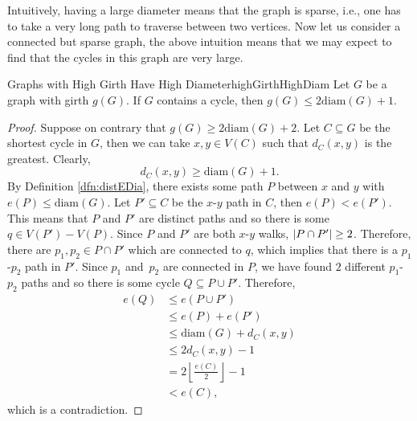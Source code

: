 \documentclass[math]{amznotes}
\theoremstyle{remark}
\newcommand{\0}{\mathbf{0}}
\newcommand{\1}{\mathbf{1}}
\begin{document}
Intuitively, having a large diameter means that the graph is sparse, i.e., one has to take a very long path to traverse between two vertices. Now let us consider a connected but sparse graph, the above intuition means that we may expect to find that the cycles in this graph are very large.
\begin{probox}{Graphs with High Girth Have High Diameter}{highGirthHighDiam}
    Let $G$ be a graph with girth $g(G)$. If $G$ contains a cycle, then $g(G) \leq 2\mathrm{diam}(G) + 1$.
    \tcblower
    \begin{proof}
        Suppose on contrary that $g(G) \geq 2\mathrm{diam}(G) + 2$. Let $C \subseteq G$ be the shortest cycle in $G$, then we can take $x, y \in V(C)$ such that $d_C(x, y)$ is the greatest. Clearly, 
        \begin{equation*}
            d_C(x, y) \geq \mathrm{diam}(G) + 1.
        \end{equation*}
        By Definition \ref{dfn:distEDia}, there exists some path $P$ between $x$ and $y$ with $e(P) \leq \mathrm{diam}(G)$. Let $P' \subseteq C$ be the $x$-$y$ path in $C$, then $e(P) < e(P')$. This means that $P$ and $P'$ are distinct paths and so there is some $q \in V(P') - V(P)$. Since $P$ and $P'$ are both $x$-$y$ walks, ${\left\lvert {P \cap P'} \right\rvert} \geq 2$. Therefore, there are $p_1, p_2 \in P \cap P'$ which are connected to $q$, which implies that there is a $p_1$-$p_2$ path in $P'$. Since $p_1$ and~$p_2$ are connected in $P$, we have found $2$ different $p_1$-$p_2$ paths and so there is some cycle $Q \subseteq P \cup P'$. Therefore,
        \begin{align*}
            e(Q) & \leq e(P\cup P') \\
            & \leq e(P) + e(P') \\
            & \leq \mathrm{diam}(G) + d_C(x, y) \\
            & \leq 2d_C(x, y) - 1 \\
            & = 2\left\lfloor\frac{e(C)}{2}\right\rfloor - 1 \\
            & < e(C),
        \end{align*}
        which is a contradiction.
    \end{proof}
\end{probox}
\end{document}

